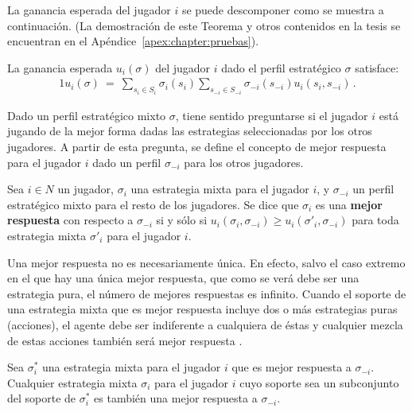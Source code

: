 La ganancia esperada del jugador $i$ se puede descomponer como se muestra a continuación. (La demostración de este Teorema y otros contenidos en la tesis se encuentran en el Apéndice~\ref{apex:chapter:pruebas}).

\begin{theorem}
\label{theo:ganancia-esperada}
La ganancia esperada $u_i(\sigma)$ del jugador $i$ dado el perfil estratégico $\sigma$ satisface:
\begin{alignat}{1}
u_i(\sigma)\ =\ \sum_{s_i\in S_i} \sigma_i(s_i) \sum_{s_{-i}\in S_{-i}} \sigma_{-i}(s_{-i}) u_i(s_i,s_{-i}) \,.
\end{alignat}
\end{theorem}

Dado un perfil estratégico mixto $\sigma$, tiene sentido preguntarse si el jugador $i$ está jugando de la mejor forma dadas las estrategias seleccionadas por los otros jugadores. A partir de esta pregunta, se define el concepto de mejor respuesta para el jugador $i$ dado un perfil $\sigma_{-i}$ para los otros jugadores.

\begin{definition}
\label{def:mejor-respuesta}
Sea $i\in N$ un jugador, $\sigma_i$ una estrategia mixta para el jugador $i$, y $\sigma_{-i}$ un perfil estratégico mixto para el resto de los jugadores. Se dice que $\sigma_i$ es una \textbf{mejor respuesta} con respecto a $\sigma_{-i}$ si y s\'olo si
$u_i(\sigma_i,\sigma_{-i}) \geq u_i(\sigma'_i,\sigma_{-i})$ para toda estrategia mixta $\sigma'_i$ para el jugador $i$.
\end{definition}

Una mejor respuesta no es necesariamente única. En efecto, salvo el caso extremo en el que hay una única mejor respuesta, que como se verá debe ser una estrategia pura, el número de mejores respuestas es infinito. Cuando el soporte de una estrategia mixta que es mejor respuesta incluye dos o más estrategias puras (acciones), el agente debe ser indiferente a cualquiera de éstas y cualquier mezcla de estas  acciones también será mejor respuesta \cite{bib:tutorial-existence-nash}.

\begin{theorem}
\label{theo:mejor-respuesta}
Sea $\sigma^*_i$ una estrategia mixta para el jugador $i$ que es mejor respuesta a $\sigma_{-i}$. Cualquier estrategia mixta $\sigma_i$ para el jugador $i$ cuyo soporte sea un subconjunto del soporte de $\sigma^*_i$ es también una mejor respuesta a $\sigma_{-i}$.
\end{theorem}

